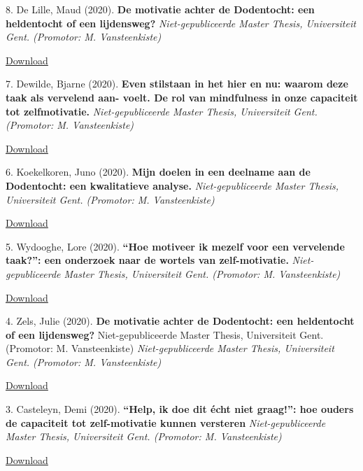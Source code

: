 \documentclass[
]{article}
\begin{document}
8. De Lille, Maud (2020). \textbf{De motivatie achter de Dodentocht: een
heldentocht of een lijdensweg?} \emph{Niet-gepubliceerde Master Thesis,
Universiteit Gent. (Promotor: M. Vansteenkiste)}

\href{download/sciencs/masterproeven/Masterproef\%20II_MaudDeLille_Waar\%20een\%20wil\%20is,\%20is\%20een\%20weg.pdf}{Download
}

7. Dewilde, Bjarne (2020). \textbf{Even stilstaan in het hier en nu:
waarom deze taak als vervelend aan- voelt. De rol van mindfulness in
onze capaciteit tot zelfmotivatie.} \emph{Niet-gepubliceerde Master
Thesis, Universiteit Gent. (Promotor: M. Vansteenkiste)}

\href{download/sciencs/masterproeven/HUISWERK\%20IN\%20TIJDEN\%20VAN\%20CORONA\%20HET\%20VERBAND\%20TUSSEN\%20SCHOOLMOTIVATIE,\%20ZELFMOTIVATIE\%20EN\%20MINDFULNESS.pdf}{Download
}

6. Koekelkoren, Juno (2020). \textbf{Mijn doelen in een deelname aan de
Dodentocht: een kwalitatieve analyse.} \emph{Niet-gepubliceerde Master
Thesis, Universiteit Gent. (Promotor: M. Vansteenkiste)}

\href{download/sciencs/masterproeven/01305553_Juno\%20KOEKELKOREN_Masterproef_Doelgericht\%20in\%20beweging.pdf}{Download
}

5. Wydooghe, Lore (2020). \textbf{``Hoe motiveer ik mezelf voor een
vervelende taak?'': een onderzoek naar de wortels van zelf-motivatie.}
\emph{Niet-gepubliceerde Master Thesis, Universiteit Gent. (Promotor: M.
Vansteenkiste)}

\href{download/sciencs/masterproeven/Masterproef\%20-\%20Hoe\%20motiveer\%20je\%20jezelf\%20voor\%20een\%20vervelende\%20taak\%20-\%20Lore\%20Wydooghe.pdf}{Download
}

4. Zels, Julie (2020). \textbf{De motivatie achter de Dodentocht: een
heldentocht of een lijdensweg?} Niet-gepubliceerde Master Thesis,
Universiteit Gent. (Promotor: M. Vansteenkiste) \emph{Niet-gepubliceerde
Master Thesis, Universiteit Gent. (Promotor: M. Vansteenkiste)}

\href{download/sciencs/masterproeven/De\%20motivatie\%20achter\%20de\%20Dodentocht_JulieZels.pdf}{Download
}

3. Casteleyn, Demi (2020). \textbf{``Help, ik doe dit écht niet
graag!'': hoe ouders de capaciteit tot zelf-motivatie kunnen versteren}
\emph{Niet-gepubliceerde Master Thesis, Universiteit Gent. (Promotor: M.
Vansteenkiste)}

\href{download/sciencs/masterproeven/MasterproefII_Demi_Casteleyn.pdf}{Download
}
\end{document}
